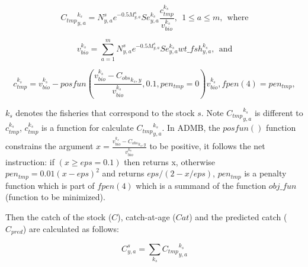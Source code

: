 \documentclass{article}
\begin{document}
\begin{equation}
{C_{tmp}}^{k_s}_{y,a}=N^s_{y,a} e^{-0.5M^s_{y,a}} Se_{y,a}^{k_s} \dfrac{c_{tmp}^{k_s}}{v_{bio}^{k_s}}, \ \  1\leq a \leq m, \ \ \text{where}
\end{equation}

\begin{equation}
v_{bio}^{k_s}=\sum_{a=1}^m N^s_{y,a} e^{-0.5M^s_{y,a}} Se_{y,a}^{k_s} wt\_fsh^{k_s}_{y,a}, \ \ \text{and} 
\end{equation}
    

\begin{equation}
c_{tmp}^{k_s} = v_{bio}^{k_s}-posfun\left(\frac{v_{bio}^{k_s} - {C_{obs}}_{k_s,y}}{v_{bio}^{k_s}} , 0.1 , pen_{tmp}=0 \right) v_{bio}^{k_s}, fpen(4)=pen_{tmp},
\end{equation}

 $k_s$ denotes the fisheries that correspond to the stock $s$. Note ${C_{tmp}}^{k_s}_{y,a}$ is different to $c_{tmp}^{k_s}$, $c_{tmp}^{k_s}$ is a 
 function for calculate ${C_{tmp}}^{k_s}_{y,a}$. In ADMB, the $posfun()$ function constrains the argument $\displaystyle x = \frac{v_{bio}^{k_s} - {C_{obs}}_{k_s,y}}{v_{bio}^{k_s}}$ to be positive, it follows the net instruction: if $(x\geq eps=0.1)$ then returns x, otherwise $pen_{tmp}=0.01(x-eps)^2$ and returns $eps/(2-x/eps)$, $pen_{tmp}$ is a penalty function which is part of $fpen(4)$ which is a summand of the function $obj\_fun$ (function to be minimized). 


Then the catch of the stock ($C$), catch-at-age ($Cat$) and the predicted catch ($C_{pred}$) are calculated as follows:

\begin{equation}
C^s_{y,a}=\sum_{k_s}{C_{tmp}}^{k_s}_{y,a} 
\end{equation}
\end{document}
